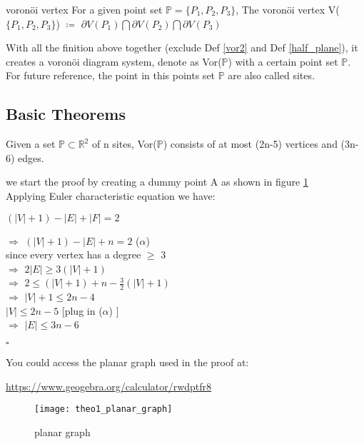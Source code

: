 \documentclass[12pt]{article}
\numberwithin{equation}{section}
\let\bb\mathbb
\newenvironment{coro}[2][]{\begin{box_for_coro}[#1]{#2}}{\end{box_for_coro}}
\newenvironment{proof}{\begin{box_for_proof}}{\end{box_for_proof}}
\newenvironment{general}[2][]{\begin{box_for_gene}[#1]{#2}}{\end{box_for_gene}}
\let\bb\mathbb
\begin{document}
	\begin{general}[vor_vertex]{voronöi vertex}
		For a given point set $\bb{P} = \{ P_1, P_2, P_3 \}$,
			The voronöi vertex V($\{P_1, P_2, P_3\}$) $\coloneqq $ $\partial V(P_1) \bigcap \partial V(P_2) \bigcap \partial V(P_3)$ 
	\end{general}
	
	With all the finition above together (exclude Def \ref{vor2} and Def \ref {half_plane}), it creates a voronöi diagram system, denote as Vor($\bb{P}$) with a certain point set $\bb{P}$. For future reference, the point in this points set $\bb{P}$ are also called sites.
	
	\subsection{Basic Theorems}
		\begin{coro}[title = Theorem 1]{}
			Given a set $\bb{P} \subset \bb{R}^2 $ of n sites, Vor($\bb{P}$) consists of at most (2n-5) vertices and (3n-6) edges.
		\end{coro}
		
		
		\begin{proof}
			we start the proof by creating a dummy point A as shown in figure \ref{fig:pg1} \\
			Applying Euler characteristic equation we have: \par 
			$(|V|+1) - |E| +|F| = 2$ \par 
			$\Rightarrow$ $(|V|+1) - |E| + n = 2$ ($\alpha$) \\
			since every vertex has a degree $\geq$ 3\\
			$\Rightarrow$ $2|E| \geq 3(|V|+1)$\\
			$\Rightarrow$ $2\leq (|V|+1) + n -\frac{3}{2}(
			|V|+1)$\\
			$\Rightarrow$ $|V|+1 \leq 2n-4$\\
			$|V| \leq 2n-5 $ [plug in ($\alpha$) ] \\
			$\Rightarrow$ $|E|\leq 3n-6 $\\
			\begin{flushright}
				$\square$
			\end{flushright}
			
			
		\end{proof}
			You could access the planar graph used in the proof at:\par 
			\url{https://www.geogebra.org/calculator/rwdptfr8}
			
		\begin{figure}
			\centering
			\texttt{[image: theo1\_planar\_graph]}
			\caption{planar graph}
			\label{fig:pg1}
		\end{figure}
\end{document}
